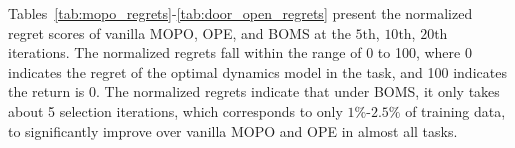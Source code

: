 \begin{comment}
Figure~\ref{fig:baselines} shows the regret performance of BOMS and the baselines. We can observe that BOMS indeed outperforms the baseline methods on almost all the MuJoCo and Adroit tasks.  
While OPE and MOPO can achieve low regrets on a few tasks, they are clearly not reliable enough for effective model selection. 
On the other hand, Random Selection generally improves the regret performance as the selection epoch increases, but its progress appears much slower than BOMS.
For further evaluation, we proceed to understand how much performance can be improved solely through a small amount of online interaction. 
\end{comment}
Tables~\ref{tab:mopo_regrets}-\ref{tab:door_open_regrets} present the normalized regret scores of vanilla MOPO, OPE, and BOMS at the $5{\text{th}}$, $10{\text{th}}$, $20{\text{th}}$ iterations. The normalized regrets fall within the range of 0 to 100, where 0 indicates the regret of the optimal dynamics model in the task, and 100 indicates the return is 0. The normalized regrets indicate that under BOMS, it only takes about 5 selection iterations, which corresponds to only $1\%$-$2.5\%$ of training data, to significantly improve over vanilla MOPO and OPE in almost all tasks. 

